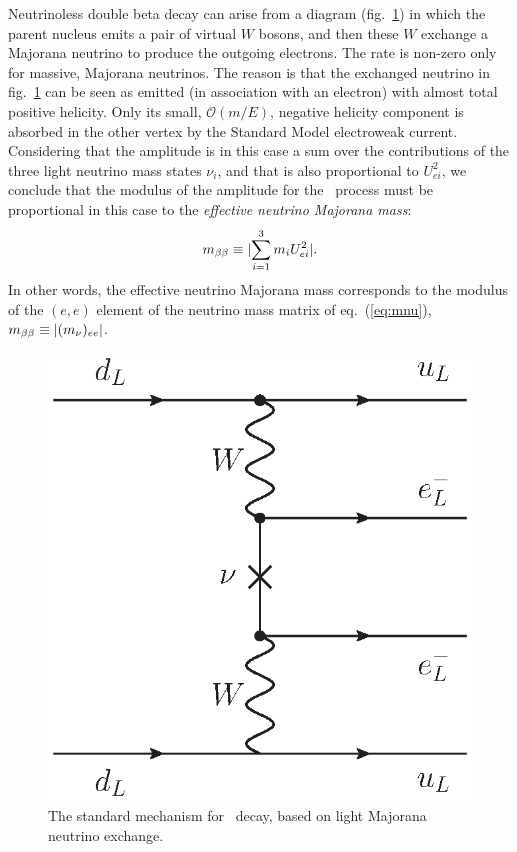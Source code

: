Neutrinoless double beta decay can arise from a diagram (fig.~\ref{fig:bb0nu_standardmechanism}) in which the parent nucleus emits a pair of virtual $W$ bosons, and then these $W$ exchange a Majorana neutrino to produce the outgoing electrons. The rate is non-zero only for massive, Majorana neutrinos. The reason is that the exchanged neutrino in fig.~\ref{fig:bb0nu_standardmechanism} can be seen as emitted (in association with an electron) with almost total positive helicity. Only its small, $\mathcal{O}(m/E)$, negative helicity component is absorbed in the other vertex by the Standard Model electroweak current. Considering that the amplitude is in this case a sum over the contributions of the three light neutrino mass states $\nu_i$, and that is also proportional to $U_{ei}^2$, we conclude that the modulus of the amplitude for the \bbonu\ process must be proportional in this case to the \emph{effective neutrino Majorana mass}:
%
\begin{equation}
m_{\beta\beta} \equiv \lvert \sum_{i=1}^{3} m_i U_{ei}^2 \rvert. \label{eq:mbb}
\end{equation}
%
In other words, the effective neutrino Majorana mass corresponds to the modulus of the $(e,e)$ element of the neutrino mass matrix of eq.~(\ref{eq:mnu}), $m_{\beta\beta}\equiv \lvert (m_{\nu})_{ee}\rvert$.

\begin{figure}[t!b!]
\begin{center}
\includegraphics[scale=0.55]{img/FD_lightnu.eps}
\end{center}
\caption{\label{fig:bb0nu_standardmechanism}The standard mechanism for \bbonu\ decay, based on light Majorana neutrino exchange.}   
\end{figure}


